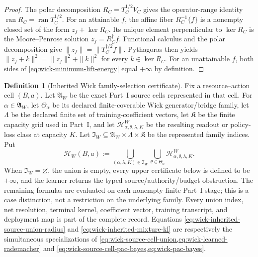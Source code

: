 \documentclass[11pt]{article}
\numberwithin{section}{part}
\theoremstyle{plain}
\theoremstyle{definition}
\newtheorem{definition}[definition]{Definition}
\theoremstyle{remark}
\begin{document}
\begin{proof}
The polar decomposition \(R_C=T_C^{1/2}V_C\) gives the operator-range
identity \(\operatorname{ran}R_C=\operatorname{ran}T_C^{1/2}\).  For an
attainable \(f\), the affine fiber \(R_C^{-1}\{f\}\) is a nonempty closed
set of the form \(z_f+\ker R_C\).  Its unique element perpendicular to
\(\ker R_C\) is the Moore--Penrose solution \(z_f=R_C^\dagger f\).
Functional calculus and the polar decomposition give
\(\|z_f\|=\|T_C^{\dagger/2}f\|\).  Pythagoras then yields
\(\|z_f+k\|^2=\|z_f\|^2+\|k\|^2\) for every \(k\in\ker R_C\).  For an
unattainable \(f\), both sides of \eqref{eq:wick-minimum-lift-energy} equal
\(+\infty\) by definition.
\end{proof}

\begin{definition}[Inherited Wick family-selection certificate]
\label{def:wick-inherited-family-selection-certificate}
Fix a resource--action cell \((B,a)\).  Let
\(\mathfrak A_W\) be the exact Part~I source cells represented in that cell.
For \(\alpha\in\mathfrak A_W\), let \(\Theta_\alpha\) be its
declared finite-coverable Wick generator/bridge family, let \(\Lambda\) be
the declared finite set of training-coefficient vectors, let \(\mathfrak K\)
be the finite capacity grid used in Part~I, and let
\(\mathcal H_{\alpha,\theta,\lambda,K}^W\) be the resulting readout or
policy-loss class at capacity \(K\).  Let
\(\mathfrak I_W\subseteq\mathfrak A_W\times\Lambda\times\mathfrak K\)
be the represented family indices.  Put
\begin{equation}
 \label{eq:wick-inherited-model-union}
 \mathcal H_W(B,a)
 :=\bigcup_{(\alpha,\lambda,K)\in\mathfrak I_W}
   \bigcup_{\theta\in\Theta_\alpha}
   \mathcal H_{\alpha,\theta,\lambda,K}^W.
\end{equation}
When \(\mathfrak I_W=\varnothing\), the union is empty, every upper
certificate below is defined to be \(+\infty\), and the learner returns the
typed source/authority/budget obstruction.  The remaining formulas are
evaluated on each nonempty finite Part~I stage; this is a case distinction,
not a restriction on the underlying family.
Every union index, net resolution, terminal kernel, coefficient vector,
training transcript, and deployment map is part of the complete record.
Equations \eqref{eq:wick-inherited-source-union-radius} and
\eqref{eq:wick-inherited-mixture-kl} are respectively the simultaneous
specializations of
\cref{eq:wick-source-cell-union,eq:wick-learned-rademacher} and
\cref{eq:wick-source-cell-pac-bayes,eq:wick-pac-bayes}.


\end{definition}
\end{document}

